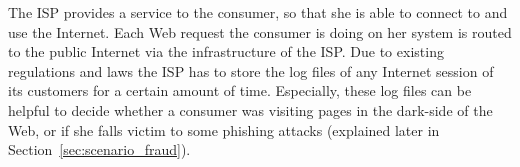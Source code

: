 The \gls{ISP} provides a service to the consumer, so that she is able to connect to and use the Internet. Each Web request the consumer is doing on her system is routed to the public Internet via the infrastructure of the \gls{ISP}. Due to existing regulations and laws the \gls{ISP} has to store the log files of any Internet session of its customers for a certain amount of time. Especially, these log files can be helpful to decide whether a consumer was visiting pages in the dark-side of the Web, or if she falls victim to some phishing attacks (explained later in Section~\ref{sec:scenario_fraud}).


